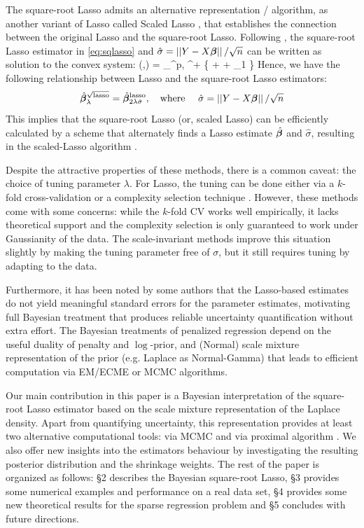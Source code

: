 \documentclass[12pt]{article}
\begin{document}
The square-root Lasso admits an alternative representation / algorithm, as another variant of Lasso called Scaled Lasso \citep{sun2012scaled}, that establishes the connection between the original Lasso and the square-root Lasso. Following \citet{giraud2014introduction},  the square-root Lasso estimator in \eqref{eq:sqlasso} and $\hat{\sigma} = \left|\left|Y-X\boldsymbol{\beta}\right|\right|/\sqrt{n}$ can be written as solution to the convex system:
\beq
(\hat{\bbeta},\hat{\sigma}) = \argmin_{\bbeta \in \Re^p, \sigma \in \Re^+} \left\{  +  + \lambda \norm{\bbeta}_1 \right\}
\eeq
Hence, we have the following relationship between Lasso and the square-root Lasso estimators:
\[
\hat{\boldsymbol{\beta}}_{\lambda}^{\sqrt{\text{lasso}}} = \hat{\boldsymbol{\beta}}_{2\lambda \hat{\sigma}}^{\text{lasso}}, \quad \text{where } \quad \hat{\sigma} = \left|\left|Y-X\boldsymbol{\beta}\right|\right|/\sqrt{n}
\]
This implies that the square-root Lasso (or, scaled Lasso) can be efficiently calculated by a scheme that alternately finds a Lasso estimate $\hat{\boldsymbol{\beta}}$ and $\hat{\sigma}$, resulting in the scaled-Lasso algorithm \citep{sun2012scaled}.  

Despite the attractive properties of these methods, there is a common caveat: the choice of tuning parameter $\lambda$. For Lasso, the tuning can be done either via a $k$-fold cross-validation or a complexity selection technique \citep{giraud2012high}. However, these methods come with some concerns: while the $k$-fold CV works well empirically, it lacks theoretical support and the complexity selection is only guaranteed to work under Gaussianity of the data. The scale-invariant methods improve this situation slightly by making the tuning parameter free of $\sigma$, but it still requires tuning by adapting to the data. 

Furthermore, it has been noted by some authors \citep{chatterjee2011bootstrap} that the Lasso-based estimates do not yield meaningful standard errors for the parameter estimates, motivating full Bayesian treatment that produces reliable uncertainty quantification without extra effort. The Bayesian treatments of penalized regression depend on the useful duality of penalty and $\log$-prior, and (Normal) scale mixture representation of the prior (e.g. Laplace as Normal-Gamma) that leads to efficient computation via EM/ECME or MCMC algorithms.

Our main contribution in this paper is a Bayesian interpretation of the square-root Lasso estimator based on the scale mixture representation of the Laplace density. Apart from quantifying uncertainty, this representation provides at least two alternative computational tools: via MCMC and via proximal algorithm \citep{polson2015proximal}. We also offer new insights into the estimators behaviour by investigating the resulting posterior distribution and the shrinkage weights. The rest of the paper is organized as follows: \S 2 describes the Bayesian square-root Lasso, \S 3 provides some numerical examples and performance on a real data set, \S 4 provides some new theoretical results for the sparse regression problem and \S 5 concludes with future directions.   
\end{document}
